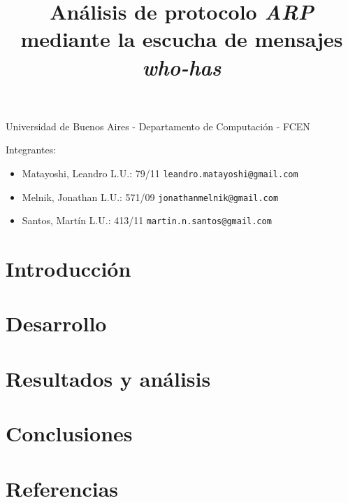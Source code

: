 \documentclass[a4paper,11pt]{article}
\title{Análisis de protocolo \emph{ARP} mediante la escucha de mensajes \emph{who-has} }
\begin{document}
\maketitle

\begin{center}
	Universidad de Buenos Aires - Departamento de Computaci\'on - FCEN
\end{center}

\vspace{2cm}
Integrantes:

\begin{itemize}
	\item Matayoshi, Leandro L.U.: 79/11 \verb+leandro.matayoshi@gmail.com+
	\item Melnik, Jonathan L.U.: 571/09 \verb+jonathanmelnik@gmail.com+
	\item Santos, Martín L.U.: 413/11 \verb+martin.n.santos@gmail.com+
		
\end{itemize}

\newpage

\tableofcontents

\newpage

\section{Introducción}

	

\section{Desarrollo}



\section{Resultados y análisis}




\section{Conclusiones}

\section{Referencias}


\end{document}
